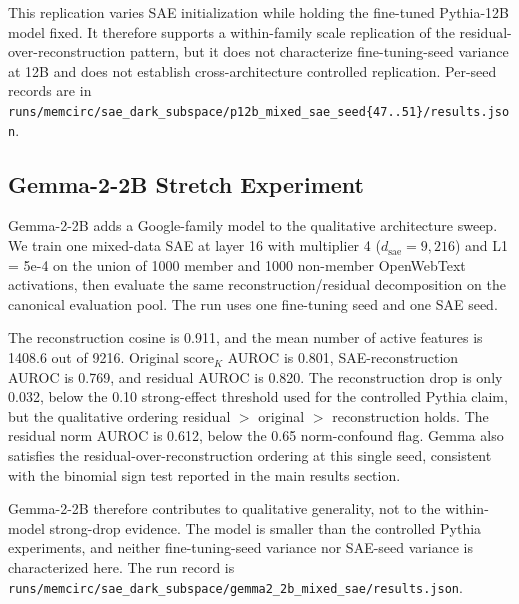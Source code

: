 This replication varies SAE initialization while holding the fine-tuned Pythia-12B model fixed. It therefore supports a within-family scale replication of the residual-over-reconstruction pattern, but it does not characterize fine-tuning-seed variance at 12B and does not establish cross-architecture controlled replication. Per-seed records are in \texttt{runs/\allowbreak{}memcirc/\allowbreak{}sae\_\allowbreak{}dark\_\allowbreak{}subspace/\allowbreak{}p12b\_\allowbreak{}mixed\_\allowbreak{}sae\_\allowbreak{}seed\{47..51\}/\allowbreak{}results.json}.

\subsection{Gemma-2-2B Stretch Experiment}
\label{app:gemma_stretch}

Gemma-2-2B adds a Google-family model to the qualitative architecture sweep. We train one mixed-data SAE at layer 16 with multiplier 4 ($d_{\text{sae}} = 9{,}216$) and L1 = 5e-4 on the union of 1000 member and 1000 non-member OpenWebText activations, then evaluate the same reconstruction/residual decomposition on the canonical evaluation pool. The run uses one fine-tuning seed and one SAE seed.

The reconstruction cosine is 0.911, and the mean number of active features is 1408.6 out of 9216. Original $\mathrm{score}_K$ AUROC is 0.801, SAE-reconstruction AUROC is 0.769, and residual AUROC is 0.820. The reconstruction drop is only 0.032, below the 0.10 strong-effect threshold used for the controlled Pythia claim, but the qualitative ordering residual $>$ original $>$ reconstruction holds. The residual norm AUROC is 0.612, below the 0.65 norm-confound flag. Gemma also satisfies the residual-over-reconstruction ordering at this single seed, consistent with the binomial sign test reported in the main results section.

Gemma-2-2B therefore contributes to qualitative generality, not to the within-model strong-drop evidence. The model is smaller than the controlled Pythia experiments, and neither fine-tuning-seed variance nor SAE-seed variance is characterized here. The run record is \texttt{runs/\allowbreak{}memcirc/\allowbreak{}sae\_\allowbreak{}dark\_\allowbreak{}subspace/\allowbreak{}gemma2\_\allowbreak{}2b\_\allowbreak{}mixed\_\allowbreak{}sae/\allowbreak{}results.json}.

